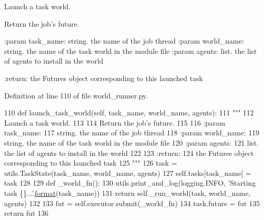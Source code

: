 \begin{DoxyVerb}Launch a task world.

Return the job's future.

:param task_name:
    string. the name of the job thread
:param world_name:
    string. the name of the task world in the module file
:param agents:
    list. the list of agents to install in the world

:return:
    the Futures object corresponding to this launched task
\end{DoxyVerb}
 

Definition at line 110 of file world\+\_\+runner.\+py.


\begin{DoxyCode}
110     \textcolor{keyword}{def }launch\_task\_world(self, task\_name, world\_name, agents):
111         \textcolor{stringliteral}{"""}
112 \textcolor{stringliteral}{        Launch a task world.}
113 \textcolor{stringliteral}{}
114 \textcolor{stringliteral}{        Return the job's future.}
115 \textcolor{stringliteral}{}
116 \textcolor{stringliteral}{        :param task\_name:}
117 \textcolor{stringliteral}{            string. the name of the job thread}
118 \textcolor{stringliteral}{        :param world\_name:}
119 \textcolor{stringliteral}{            string. the name of the task world in the module file}
120 \textcolor{stringliteral}{        :param agents:}
121 \textcolor{stringliteral}{            list. the list of agents to install in the world}
122 \textcolor{stringliteral}{}
123 \textcolor{stringliteral}{        :return:}
124 \textcolor{stringliteral}{            the Futures object corresponding to this launched task}
125 \textcolor{stringliteral}{        """}
126         task = utils.TaskState(task\_name, world\_name, agents)
127         self.tasks[task\_name] = task
128 
129         \textcolor{keyword}{def }\_world\_fn():
130             utils.print\_and\_log(logging.INFO, \textcolor{stringliteral}{'Starting task \{\}...'}.\hyperlink{namespaceparlai_1_1chat__service_1_1services_1_1messenger_1_1shared__utils_a32e2e2022b824fbaf80c747160b52a76}{format}(task\_name))
131             \textcolor{keywordflow}{return} self.\_run\_world(task, world\_name, agents)
132 
133         fut = self.executor.submit(\_world\_fn)
134         task.future = fut
135         \textcolor{keywordflow}{return} fut
136 
\end{DoxyCode}
\mbox{\label{classparlai_1_1chat__service_1_1services_1_1messenger_1_1world__runner_1_1MessengerWorldRunner_a4fab2907172298b233a9512726523432}} 
